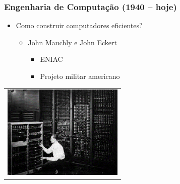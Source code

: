 \documentclass[aspectratio=169]{beamer}
\begin{document}
	\begin{frame}
		\frametitle{Engenharia de Computação (1940 – hoje)}
		\begin{itemize}
			\item Como construir computadores eficientes?
			\begin{itemize}
				\item John Mauchly e John Eckert
				\begin{itemize}
					\item ENIAC
					\item Projeto militar americano
				\end{itemize}
			\end{itemize}
		\end{itemize}
		
		\begin{table}
			\centering
			\begin{tabular}{c}				
				\includegraphics[height=4.5cm, keepaspectratio]{../figs/cap01/eniac.png} \\		
				
			\end{tabular}
		\end{table}
	\end{frame}
\end{document}
